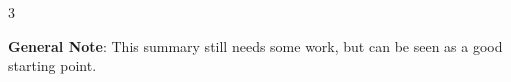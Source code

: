 \documentclass[\fontheight]{extarticle}
\begin{document}
\begin{multicols*}{3}

    \newpar{}
    \textbf{General Note}: This summary still needs some work, but can be seen as a good starting point.

    
    \newpage
    
    \newpage
    
    \newpage
    
    \newpage
    
    \newpage
    
    \newpage
    
    \newpage
    
    \newpage
    
    \newpage
    
    \newpage
    
    \newpage
    
    \newpage
    

\end{multicols*}
\end{document}
